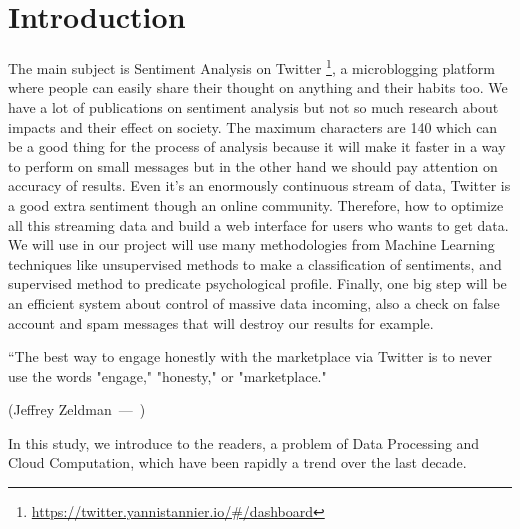 \documentclass{acmtog} %
\let\oldquote\quote
\let\endoldquote\endquote
\renewenvironment{quote}[2][]
  {\if\relax\detokenize{#1}\relax
     \def\quoteauthor{#2}%
   \else
     \def\quoteauthor{#2~---~#1}%
   \fi
   \oldquote}
  {\par\nobreak\smallskip\hfill(\quoteauthor)%
   \endoldquote\addvspace{\bigskipamount}}
\begin{document}
\section{Introduction}

The main subject is Sentiment Analysis on Twitter \footnote{\url{https://twitter.yannistannier.io/\#/dashboard}}, a microblogging platform where people can easily share their thought on anything and their habits too. We have a lot of publications on sentiment analysis but not so much research about impacts and their effect on society. The maximum characters are 140 which can be a good thing for the process of analysis because it will make it faster in a way to perform on small messages but in the other hand we should pay attention on accuracy of results. Even it's an enormously continuous stream of data, Twitter is a good extra sentiment though an online community. Therefore, how to optimize all this streaming data and build a web interface for users who wants to get data. We will use in our project will use many methodologies from Machine Learning techniques like unsupervised methods to make a classification of sentiments, and supervised method to predicate psychological profile. Finally, one big  step will be an efficient system about control of massive data incoming, also a check on false account and spam messages that will destroy our results for example.
 
\begin{quote}{Jeffrey Zeldman}
“The best way to engage honestly with the marketplace via Twitter is to never use the words "engage," "honesty," or "marketplace." 
\end{quote}

In this study, we introduce to the readers, a problem of Data Processing and Cloud Computation, which have been rapidly a trend over the last decade. 
\end{document}
